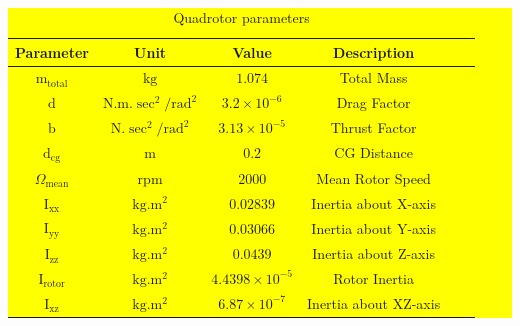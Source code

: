 \documentclass[3p]{elsarticle}
\begin{document}
\begin{table}[H]
    \centering
    \colorbox{yellow}{ %
    \begin{minipage}{\linewidth} %
        \centering
        \caption{Quadrotor parameters}
        \renewcommand{\arraystretch}{1.3}
        \begin{tabular}{cccccc}
        \hline
        Parameter & Unit & Value & Description \\
        \hline
        $\mathrm{m}_{\text{total}}$ & $\mathrm{kg}$ & $1.074$ & Total Mass \\ 
        $\mathrm{d}$ & $\mathrm{N.m.\sec^2/rad^2}$ & $3.2\times10^{-6}$ & Drag Factor \\
        $\mathrm{b}$ & $\mathrm{N.\sec^2/rad^2}$ & $3.13\times10^{-5}$ & Thrust Factor \\
        $\mathrm{d}_{\text{cg}}$ & $\mathrm{m}$ & $0.2$ & CG Distance \\
        $\Omega_{\text{mean}}$ & $\mathrm{rpm}$ & $2000$ & Mean Rotor Speed \\
        \hline
        $\mathrm{I}_{\text{xx}}$ & $\mathrm{kg.m^2}$ & $0.02839$ & Inertia about X-axis \\
        $\mathrm{I}_{\text{yy}}$ & $\mathrm{kg.m^2}$ & $0.03066$ & Inertia about Y-axis \\
        $\mathrm{I}_{\text{zz}}$ & $\mathrm{kg.m^2}$ & $0.0439$ & Inertia about Z-axis \\
        $\mathrm{I}_{\text{rotor}}$ & $\mathrm{kg.m^2}$ & $4.4398\times 10^{-5}$ & Rotor Inertia \\
        $\mathrm{I}_{\text{xz}}$ & $\mathrm{kg.m^2}$ & $6.87\times 10^{-7}$ & Inertia about XZ-axis \\
        \hline
    \end{tabular}
    \label{tab:parameters}
    \end{minipage}
    }
\end{table}
\end{document}
